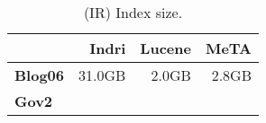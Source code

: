 \begin{table}[t]
\centering
{\small
\begin{tabular}{|l|r|r|r|}
    \hline & \textbf{Indri} & \textbf{Lucene} & \textbf{MeTA} \\
    \hline
    \textbf{Blog06} & 31.0GB & 2.0GB & 2.8GB \\
    \textbf{Gov2} & & & \\
    \hline
\end{tabular}
\caption{(IR) Index size.}
\label{table:ir-index-size}
}
\end{table}
